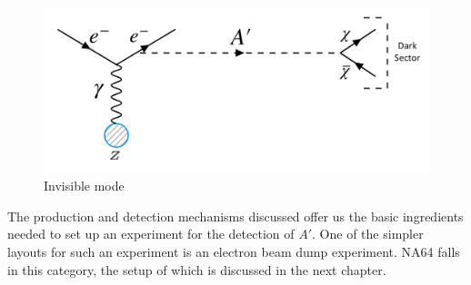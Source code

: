 \begin{figure}[t!]
\centering
\includegraphics[width=15cm]{thesis_figures/INVISIBLE.png}
\caption{Invisible mode }
\label{fig:Invisible_feynman}
\end{figure}

The production and detection mechanisms discussed offer us the basic ingredients needed to set up an experiment for the detection of $A'$. One of the simpler layouts for such an experiment is an electron beam dump experiment. NA64 falls in this category, the setup of which is discussed in the next chapter.
